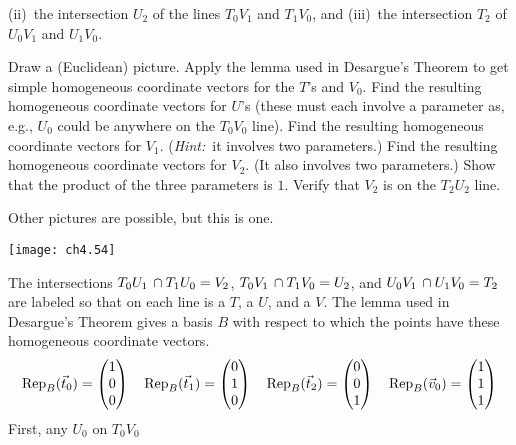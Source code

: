 \begin{exercises}
    (ii)~the intersection $U_2$ of the lines $T_0V_1$ and $T_1V_0$, and
    (iii)~the intersection $T_2$ of $U_0V_1$ and $U_1V_0$. 
    \begin{exparts}
      \partsitem Draw a (Euclidean) picture.
      \partsitem Apply the lemma used in Desargue's Theorem
        to get simple homogeneous coordinate vectors for the 
        $T$'s and $V_0$.
      \partsitem Find the resulting homogeneous coordinate vectors
        for $U$'s (these must each involve a parameter as, e.g., $U_0$ could
        be anywhere on the $T_0V_0$ line).
      \partsitem Find the resulting homogeneous coordinate vectors for 
        $V_1$.
        (\textit{Hint:}~it involves two parameters.)
      \partsitem Find the resulting homogeneous coordinate vectors for 
        $V_2$.
        (It also involves two parameters.)
      \partsitem Show that the product of the three parameters is $1$.
      \partsitem Verify that $V_2$ is on the $T_2U_2$ line.
    \end{exparts}
    \begin{answer}
      \begin{exparts}
        \partsitem Other pictures are possible, but this is one.
          \begin{center}
            \texttt{[image: ch4.54]}
          \end{center}
          The intersections 
          $
              T_0U_1\,\intersection T_1U_0=V_2
          $, $
              T_0V_1\,\intersection T_1V_0=U_2
          $, and $
              U_0V_1\,\intersection U_1V_0=T_2
          $
          are labeled so that on each line is a $T$, a $U$, and a $V$.
        \partsitem The lemma used in Desargue's Theorem gives a 
          basis $B$ with respect to which the points have these
          homogeneous coordinate vectors.
          \begin{equation*}
            \rep{\vec{t}_0}{B}=\colvec{1 \\ 0 \\ 0}
            \quad
            \rep{\vec{t}_1}{B}=\colvec{0 \\ 1 \\ 0}
            \quad
            \rep{\vec{t}_2}{B}=\colvec{0 \\ 0 \\ 1}
            \quad
            \rep{\vec{v}_0}{B}=\colvec{1 \\ 1 \\ 1}
          \end{equation*}
        \partsitem
          First, any $U_0$ on $T_0V_0$

\end{exparts}
\end{answer}
\end{exercises}
